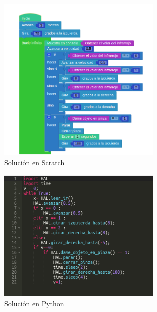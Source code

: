 \begin{figure}[H]
    \centering
    \includegraphics[width=0.7\textwidth, height=0.55\textwidth]{chapters/images/solucionpscratch.png}
    \caption{Solución en Scratch }
    \label{fig:my_label}
\end{figure}

\begin{figure}[H]
    \centering
    \includegraphics[width=0.7\textwidth, height=0.55\textwidth]{chapters/images/solucionppython.png}
    \caption{Solución en Python}
    \label{fig:my_label}
\end{figure}